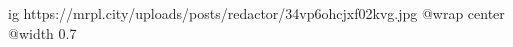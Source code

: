  
 
 
 
 

\ifcmt
  ig https://mrpl.city/uploads/posts/redactor/34vp6ohcjxf02kvg.jpg
  @wrap center
  @width 0.7
\fi
